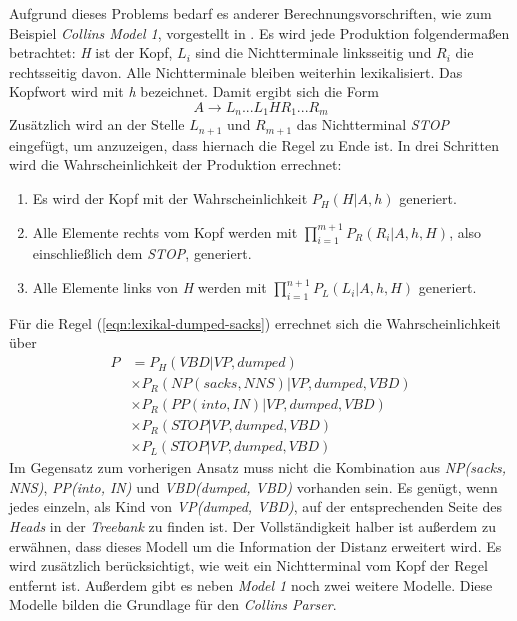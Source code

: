 Aufgrund dieses Problems bedarf es anderer Berechnungsvorschriften, wie zum Beispiel \textit{Collins Model 1}, vorgestellt in \cite{collinsModel}. 
Es wird jede Produktion folgendermaßen betrachtet: \textit{H} ist der Kopf, \( L_i \) sind die Nichtterminale linksseitig und \( R_i \) die rechtsseitig davon. Alle Nichtterminale bleiben weiterhin lexikalisiert. Das Kopfwort wird mit \textit{h} bezeichnet. Damit ergibt sich die Form
\[ A \to L_n...L_1 H R_1...R_m \]
Zusätzlich wird an der Stelle \( L_{n+1} \) und \( R_{m+1} \) das Nichtterminal \textit{STOP} eingefügt, um anzuzeigen, dass hiernach die Regel zu Ende ist. In drei Schritten wird die Wahrscheinlichkeit der Produktion errechnet:
\begin{enumerate}
\item Es wird der Kopf mit der Wahrscheinlichkeit \( P_H(H | A, h) \) generiert.
\item Alle Elemente rechts vom Kopf werden mit \( \displaystyle\prod_{i = 1}^{m+1} P_R(R_i | A, h, H) \), also einschließlich dem \textit{STOP}, generiert.
\item Alle Elemente links von \textit{H} werden mit \( \displaystyle\prod_{i = 1}^{n+1} P_L(L_i | A, h, H) \) generiert.
\end{enumerate}
Für die Regel (\ref{eqn:lexikal-dumped-sacks}) errechnet sich die Wahrscheinlichkeit über
\begin{align}
P & = P_H(VBD|VP, dumped) \nonumber \\ & \times P_R(NP(sacks, NNS)|VP, dumped, VBD) \nonumber \\ & \times P_R(PP(into, IN)|VP, dumped, VBD) \nonumber \\ & \times P_R(STOP|VP, dumped, VBD) \nonumber \\ & \times P_L(STOP|VP, dumped, VBD)
\end{align}
Im Gegensatz zum vorherigen Ansatz muss nicht die Kombination aus \textit{NP(sacks, NNS)}, \textit{PP(into, IN)} und \textit{VBD(dumped, VBD)} vorhanden sein. Es genügt, wenn jedes einzeln, als Kind von \textit{VP(dumped, VBD)}, auf der entsprechenden Seite des \textit{Heads} in der \textit{Treebank} zu finden ist. 
Der Vollständigkeit halber ist außerdem zu erwähnen, dass dieses Modell um die Information der Distanz erweitert wird. Es wird zusätzlich berücksichtigt, wie weit ein Nichtterminal vom Kopf der Regel entfernt ist. 
Außerdem gibt es neben \textit{Model 1} noch zwei weitere Modelle. Diese Modelle bilden die Grundlage für den \textit{Collins Parser}. \cite{collinsModel}